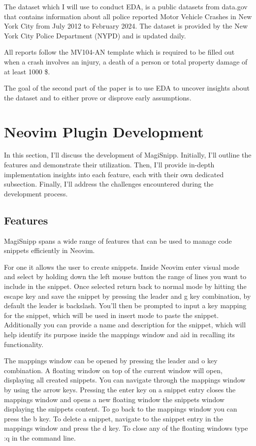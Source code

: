\documentclass[runningheads]{llncs}
\begin{document}
The dataset which I will use to conduct EDA, is a public datasets from data.gov \cite{GOV} that contains
information about all police reported Motor Vehicle Crashes in New York City from July 2012 to February 2024.
The dataset is provided by the New York City Police Department (NYPD) and is updated daily.

All reports follow the MV104-AN \cite{MV} template which is required to be filled out when a crash involves an injury,
a death of a person or total property damage of at least 1000 \$.

The goal of the second part of the paper is to use EDA to uncover insights about the dataset and to either prove or disprove early assumptions.

\section{Neovim Plugin Development}

In this section, I'll discuss the development of MagiSnipp. Initially, I'll outline the features and demonstrate their utilization. 
Then, I'll provide in-depth implementation insights into each feature, each with their own dedicated subsection. 
Finally, I'll address the challenges encountered during the development process.

\subsection{Features}

MagiSnipp spans a wide range of features that can be used to manage code snippets efficiently in Neovim.

For one it allows the user to create snippets. Inside Neovim enter visual mode and select
by holding down the left mouse button the range of lines you want to include in the snippet.
Once selected return back to normal mode by hitting the escape key and
save the snippet by pressing the leader and g key combination, by default the leader is backslash. 
You'll then be prompted to input a key mapping for the snippet, which will be used in insert mode to paste the snippet.
Additionally you can provide a name and description for the snippet, which will help identify its purpose inside the mappings 
window and aid in recalling its functionality.

The mappings window can be opened by pressing the leader and o key combination. A floating window on top of the current window will open,
displaying all created snippets. You can navigate through the mappings window by using the arrow keys.
Pressing the enter key on a snippet entry closes the mappings window and opens a new
floating window the snippets window displaying the snippets content. To go back to the mappings window you can press the b key.
To delete a snippet, navigate to the snippet entry in the mappings window and press the d key. To close 
any of the floating windows type :q in the command line.
\end{document}
